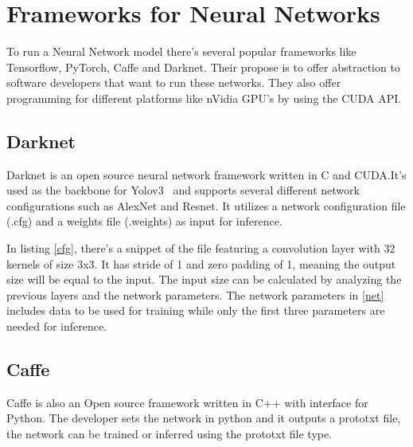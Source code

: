 
 \section{Frameworks for Neural Networks}
 \label{section:darknet}

To run a Neural Network model there's several popular frameworks like Tensorflow, PyTorch, Caffe and Darknet.
Their propose is to offer abstraction to software developers that want to run these networks. They also offer
programming for different platforms like nVidia GPU's by using the CUDA API.


\subsection{Darknet}

Darknet is an open source neural network framework written in C and CUDA.It's used as the backbone for Yolov3~\cite{yolov3} and supports several different network configurations such as AlexNet and Resnet.
 It utilizes a network configuration
file (.cfg) and a weights file (.weights) as input for inference.



In listing \ref{cfg}, there's a snippet of the file featuring
a convolution layer with 32 kernels of size 3x3. It has stride of 1 and zero padding of 1, meaning the output size will
be equal to the input. The input size can be calculated by analyzing the previous layers and the network parameters. The network parameters in \ref{net} includes
data to be used for training while only the first three parameters are needed for inference.




\subsection{Caffe}


Caffe is also an Open source framework written in C++ with interface for Python. The developer sets the network in python and it outputs a prototxt file,
the network can be trained or inferred using the prototxt file type.


